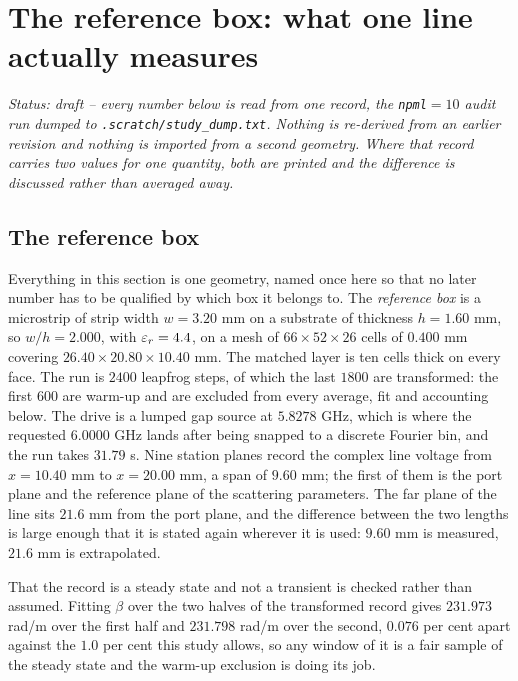 \section{The reference box: what one line actually measures}
\label{sec:msres}

\noindent\emph{Status: draft -- every number below is read from one record, the \texttt{npml}${}=10$ audit run
dumped to \texttt{.scratch/study\_dump.txt}. Nothing is re-derived from an earlier revision and nothing is
imported from a second geometry. Where that record carries two values for one quantity, both are printed and the
difference is discussed rather than averaged away.}

\subsection{The reference box}
\label{sec:msres-box}

Everything in this section is one geometry, named once here so that no later number has to be qualified by which
box it belongs to. The \emph{reference box} is a microstrip of strip width $w = 3.20$ mm on a substrate of
thickness $h = 1.60$ mm, so $w/h = 2.000$, with $\varepsilon_r = 4.4$, on a mesh of $66\times52\times26$ cells of
$0.400$ mm covering $26.40\times20.80\times10.40$ mm. The matched layer is ten cells thick on every face. The run
is $2400$ leapfrog steps, of which the last $1800$ are transformed: the first $600$ are warm-up and are excluded
from every average, fit and accounting below. The drive is a lumped gap source at $5.8278$ GHz, which is where
the requested $6.0000$ GHz lands after being snapped to a discrete Fourier bin, and the run takes $31.79$ s.
Nine station planes record the complex line voltage from $x = 10.40$ mm to $x = 20.00$ mm, a span of $9.60$ mm;
the first of them is the port plane and the reference plane of the scattering parameters. The far plane of the
line sits $21.6$ mm from the port plane, and the difference between the two lengths is large enough that it is
stated again wherever it is used: $9.60$ mm is measured, $21.6$ mm is extrapolated.

That the record is a steady state and not a transient is checked rather than assumed. Fitting $\beta$ over the
two halves of the transformed record gives $231.973$ rad/m over the first half and $231.798$ rad/m over the
second, $0.076$ per cent apart against the $1.0$ per cent this study allows, so any window of it is a fair
sample of the steady state and the warm-up exclusion is doing its job.

